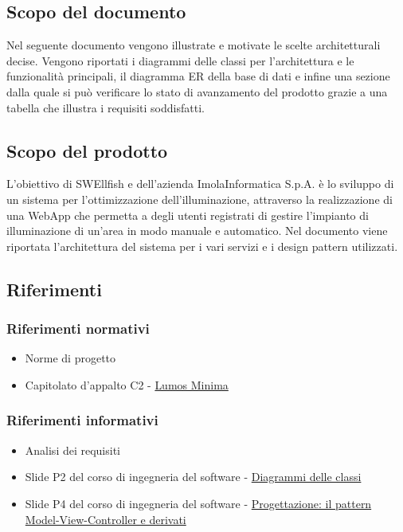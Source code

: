 \documentclass[12pt]{article}
\begin{document}
\subsection{Scopo del documento}
Nel seguente documento vengono illustrate e motivate le scelte architetturali decise. Vengono riportati i diagrammi delle classi per l'architettura e le funzionalità principali,
il diagramma ER della base di dati e infine una sezione dalla quale si può verificare lo stato di avanzamento del prodotto grazie a una tabella che illustra
i requisiti soddisfatti.

\subsection{Scopo del prodotto}
L’obiettivo di SWEllfish e dell’azienda ImolaInformatica S.p.A. è lo sviluppo di un sistema per l’ottimizzazione dell’illuminazione, attraverso la realizzazione di una WebApp che permetta a degli utenti registrati di gestire l'impianto di illuminazione
di un'area in modo manuale e automatico. Nel documento viene riportata l'architettura del sistema per i vari servizi e i design pattern utilizzati.

\subsection{Riferimenti}
\subsubsection{Riferimenti normativi}
\begin{itemize}
	\item Norme di progetto
	\item Capitolato d'appalto C2 - \href{https://www.math.unipd.it/~tullio/IS-1/2022/Progetto/C2.pdf}{Lumos Minima}
\end{itemize}
\subsubsection{Riferimenti informativi}
\begin{itemize}
	\item Analisi dei requisiti
	\item Slide P2 del corso di ingegneria del software - \href{https://www.math.unipd.it/~rcardin/swea/2023/Diagrammi%20delle%20Classi.pdf}{Diagrammi delle classi}
	\item Slide P4 del corso di ingegneria del software - \href{https://www.math.unipd.it/~rcardin/sweb/2022/L02.pdf}{Progettazione: il pattern Model-View-Controller e derivati}
\end{itemize}
\end{document}
